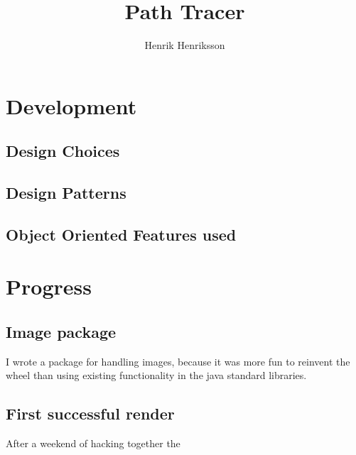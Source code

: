 \documentclass{report}
\title{Path Tracer}
\author{Henrik Henriksson}
\begin{document}
\chapter{Development}
\section{Design Choices}
\section{Design Patterns}
\section{Object Oriented Features used}

\chapter{Progress}
\section{Image package}
I wrote a package for handling images, because it was more fun to
reinvent the wheel than using existing functionality in the java
standard libraries.

\section{First successful render}
After a weekend of hacking together the
\end{document}
